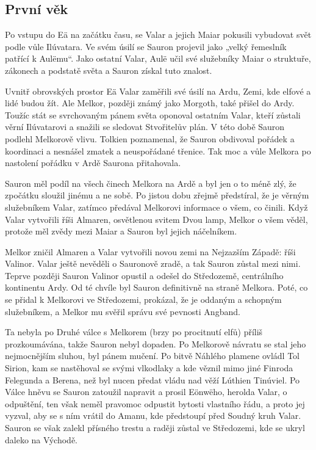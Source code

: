 \documentclass[12pt]{article} %
\begin{document}
\subsection{První věk}
Po vstupu do Eä na začátku času, se Valar a jejich Maiar pokusili vybudovat svět podle vůle Ilúvatara. Ve svém úsilí se Sauron projevil jako „velký řemeslník patřící k Aulëmu“. Jako ostatní Valar, Aulë učil své služebníky Maiar o struktuře, zákonech a podstatě světa a Sauron získal tuto znalost.

Uvnitř obrovských prostor Eä Valar zaměřili své úsilí na Ardu, Zemi, kde elfové a lidé budou žít. Ale Melkor, později známý jako Morgoth, také přišel do Ardy. Toužíc stát se svrchovaným pánem světa oponoval ostatním Valar, kteří zůstali věrní Ilúvatarovi a snažili se sledovat Stvořitelův plán. V této době Sauron podlehl Melkorově vlivu. Tolkien poznamenal, že Sauron obdivoval pořádek a koordinaci a nesnášel zmatek a neuspořádané třenice. Tak moc a vůle Melkora po nastolení pořádku v Ardě Saurona přitahovala.

Sauron měl podíl na všech činech Melkora na Ardě a byl jen o to méně zlý, že zpočátku sloužil jinému a ne sobě. Po jistou dobu zřejmě předstíral, že je věrným služebníkem Valar, zatímco předával Melkorovi informace o všem, co činili. Když Valar vytvořili říši Almaren, osvětlenou svitem Dvou lamp, Melkor o všem věděl, protože měl zvědy mezi Maiar a Sauron byl jejich náčelníkem.

Melkor zničil Almaren a Valar vytvořili novou zemi na Nejzazším Západě: říši Valinor. Valar ještě nevěděli o Sauronově zradě, a tak Sauron zůstal mezi nimi. Teprve později Sauron Valinor opustil a odešel do Středozemě, centrálního kontinentu Ardy. Od té chvíle byl Sauron definitivně na straně Melkora. Poté, co se přidal k Melkorovi ve Středozemi, prokázal, že je oddaným a schopným služebníkem, a Melkor mu svěřil správu své pevnosti Angband.

Ta nebyla po Druhé válce s Melkorem (brzy po procitnutí elfů) příliš prozkoumávána, takže Sauron nebyl dopaden. Po Melkorově návratu se stal jeho nejmocnějším sluhou, byl pánem mučení. Po bitvě Náhlého plamene ovládl Tol Sirion, kam se nastěhoval se svými vlkodlaky a kde věznil mimo jiné Finroda Felegunda a Berena, než byl nucen předat vládu nad věží Lúthien Tinúviel. Po Válce hněvu se Sauron zatoužil napravit a prosil Eönwëho, herolda Valar, o odpuštění, ten však neměl pravomoc odpustit bytosti vlastního řádu, a proto jej vyzval, aby se s ním vrátil do Amanu, kde předstoupí před Soudný kruh Valar. Sauron se však zalekl přísného trestu a raději zůstal ve Středozemi, kde se ukryl daleko na Východě. 
\end{document}
